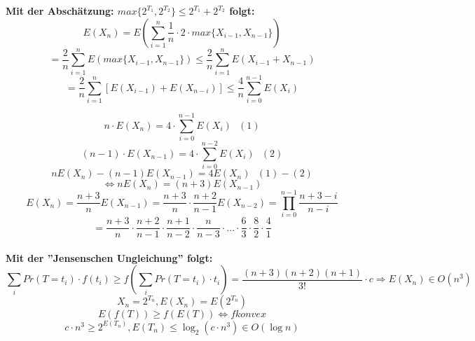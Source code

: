 \textbf{Mit der Abschätzung: $max\{2^{T_1}, 2^{T_2}\} \leq 2^{T_1} + 2^{T_2}$ folgt:}
\[E(X_n) = E \left(\sum^n_{i=1} \frac{1}{n} \cdot  2 \cdot max\{X_{i-1}, X_{n-1}\} \right) \]
\[= \frac{2}{n} \sum^n_{i=1} E \left(max\{X_{i-1}, X_{n-1}\} \right) \leq \frac{2}{n} \sum^n_{i=1} E \left(X_{i-1} + X_{n-1} \right) \]
\[=\frac{2}{n} \sum^n_{i=1} \left[E(X_{i-1}) + E(X_{n-i}) \right] \leq \frac{4}{n} \sum^{n-1}_{i=0} E(X_i)\] 

\[ n \cdot E(X_n) = 4 \cdot \sum^{n-1}_{i=0} E(X_i) ~~~(1)\]
\[ (n-1) \cdot E(X_{n-1}) = 4 \cdot \sum^{n-2}_{i=0} E(X_i) ~~~(2)\]
\[ nE(X_n) - (n-1)E(X_{n-1}) = 4E(X_n) ~~~(1)-(2)\]
\[\Leftrightarrow nE(X_n) = (n+3)E(X_{n-1})\]
\[E(X_n)=\frac{n+3}{n}E(X_{n-1})=\frac{n+3}{n} \cdot \frac{n+2}{n-1}E(X_{n-2}) = \prod^{n-1}_{i=0} \frac{n+3-i}{n-i}\]
\[ = \frac{n+3}{n} \cdot \frac{n+2}{n-1} \cdot \frac{n+1}{n-2} \cdot \frac{n}{n-3} \cdot ... \cdot \frac{6}{3} \cdot \frac{8}{2} \cdot \frac{4}{1} \]\\

\textbf{Mit der ''Jensenschen Ungleichung'' folgt:}
\[ \sum_i Pr(T=t_i) \cdot f(t_i) \geq f\left(\sum_i Pr(T=t_i) \cdot t_i\right) = \frac{ (n+3)(n+2)(n+1) } { 3!}  \cdot c \Rightarrow E(X_n) \in O(n^3)\]
\[X_n = 2^{T_n},  E(X_n) = E(2^{T_n}) \]
\[E(f(T)) \geq f(E(T)) \Leftrightarrow f konvex\]
\[c \cdot n^3 \geq 2^{E(T_n)}, E(T_n) \leq \log_2(c \cdot n^3) \in O(\log n) \]

